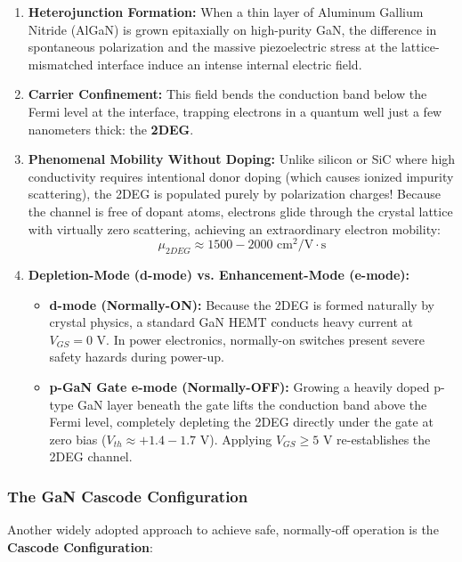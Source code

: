 \documentclass[11pt,a4paper]{article}
\begin{document}
\begin{enumerate}[leftmargin=*]
  \item \textbf{Heterojunction Formation:} When a thin layer of Aluminum Gallium Nitride (AlGaN) is grown epitaxially on high-purity GaN, the difference in spontaneous polarization and the massive piezoelectric stress at the lattice-mismatched interface induce an intense internal electric field.
  \item \textbf{Carrier Confinement:} This field bends the conduction band below the Fermi level at the interface, trapping electrons in a quantum well just a few nanometers thick: the \textbf{2DEG}.
  \item \textbf{Phenomenal Mobility Without Doping:} 
    Unlike silicon or SiC where high conductivity requires intentional donor doping (which causes ionized impurity scattering), the 2DEG is populated purely by polarization charges! 
    Because the channel is free of dopant atoms, electrons glide through the crystal lattice with virtually zero scattering, achieving an extraordinary electron mobility:
    \begin{equation}
    \mu_{2DEG} \approx 1500 - 2000\text{ cm}^2/\text{V}\cdot\text{s}
    \end{equation}
  \item \textbf{Depletion-Mode (d-mode) vs. Enhancement-Mode (e-mode):}
    \begin{itemize}
      \item \textbf{d-mode (Normally-ON):} Because the 2DEG is formed naturally by crystal physics, a standard GaN HEMT conducts heavy current at $V_{GS} = 0\text{ V}$. In power electronics, normally-on switches present severe safety hazards during power-up.
      \item \textbf{p-GaN Gate e-mode (Normally-OFF):} Growing a heavily doped p-type GaN layer beneath the gate lifts the conduction band above the Fermi level, completely depleting the 2DEG directly under the gate at zero bias ($V_{th} \approx +1.4 - 1.7\text{ V}$). Applying $V_{GS} \ge 5\text{ V}$ re-establishes the 2DEG channel.
    \end{itemize}
\end{enumerate}

\subsubsection{The GaN Cascode Configuration}
Another widely adopted approach to achieve safe, normally-off operation is the \textbf{Cascode Configuration}:
\end{document}
